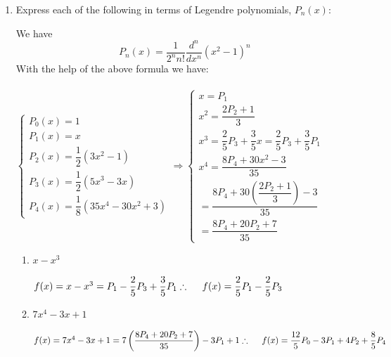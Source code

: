 \documentclass[fleqn]{article}
\begin{document}
\begin{enumerate}
    
    \item Express each of the following in terms of Legendre polynomials, $P_{n}\left( x\right) $:

      \textcolor{hwColor}{
        We have $$P_n(x)=\dfrac{1}{2^n n!} \dfrac{d^n}{dx^n} (x^2-1)^n$$
        With the help of the above formula we have: \\
        \\
        $
          \begin{cases}
            P_0(x)=1
            \\
            P_1(x)=x
            \\
            P_2(x)=\dfrac{1}{2} (3x^2-1)
            \\
            P_3(x)=\dfrac{1}{2} (5x^3-3x)
            \\
            P_4(x)=\dfrac{1}{8} (35x^4-30x^2+3)
          \end{cases} \Longrightarrow \begin{cases}
            x=P_1
            \\
            x^2=\dfrac{2P_2+1}{3}
            \\
            x^3=\dfrac{2}{5} P_3+\dfrac{3}{5}x=\dfrac{2}{5} P_3+\dfrac{3}{5}P_1
            \\
            x^4=\dfrac{8P_4+30x^2-3}{35} 
            \\
            =\dfrac{8P_4+30\left(\dfrac{2P_2+1}{3}\right)-3}{35}
            \\
            =\dfrac{8P_4+20P_2+7}{35} 
          \end{cases}
        $
      }
      
      \begin{enumerate}
        \item $x-x^{3}$
        
          \textcolor{hwColor}{
            $
              f(x)=x-x^3=P_1-\dfrac{2}{5} P_3+\dfrac{3}{5}P_1
              \\
              \\
              \therefore ~~~~ f(x)=\dfrac{2}{5} P_1-\dfrac{2}{5}P_3
            $ 
          }
        
        \item $7x^{4}-3x+1$
        
          \textcolor{hwColor}{
            $
              f(x)=7x^{4}-3x+1=7\left(\dfrac{8P_4+20P_2+7}{35}\right)-3P_1+1
              \\
              \\
              \therefore ~~~~ f(x)=\dfrac{12}{5}P_0-3P_1+4P_2+\dfrac{8}{5}P_4
            $
          }


\end{enumerate}
\end{enumerate}
\end{document}
